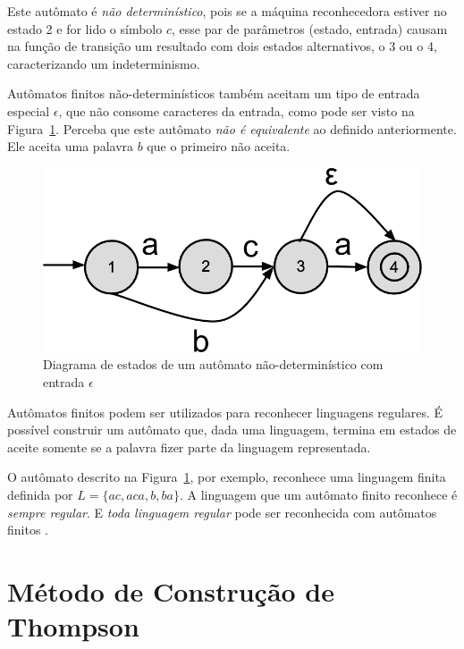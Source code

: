 \documentclass[a4paper,12pt,oneside,onecolumn]{uerj}
\begin{document}
Este autômato é \emph{não determinístico}, pois se a máquina reconhecedora estiver no  estado 2 e for lido o símbolo $c$, esse par de parâmetros (estado, entrada) causam na função de transição um resultado com dois estados alternativos, o 3 ou o 4, caracterizando um indeterminismo.

Autômatos finitos não-determinísticos também aceitam um tipo de entrada especial $\epsilon$, que não consome caracteres da entrada, como pode ser visto na Figura~\ref{fig:exemplo_automato_epsilon}. Perceba que este autômato \emph{não é equivalente} ao definido anteriormente. Ele aceita uma palavra $b$ que o primeiro não aceita.

\begin{figure}[!htbp]
  \centering
  \includegraphics[scale=0.3]{figures/exemplo_automato_epsilon.png}
  \caption{Diagrama de estados de um autômato não-determinístico com entrada $\epsilon$}
  \label{fig:exemplo_automato_epsilon}
\end{figure}


Autômatos finitos podem ser utilizados para reconhecer linguagens regulares. É possível construir um autômato que, dada uma linguagem, termina em estados de aceite somente se a palavra fizer parte da linguagem representada.

O autômato descrito na Figura~\ref{fig:exemplo_automato_epsilon}, por exemplo, reconhece uma linguagem finita definida por $L = \{ac, aca, b, ba\}$. A linguagem que um autômato finito reconhece é \emph{sempre regular}. E \emph{toda linguagem regular} pode ser reconhecida com autômatos finitos \cite{bib:Kleene56}.

\section{Método de Construção de Thompson}
\end{document}
